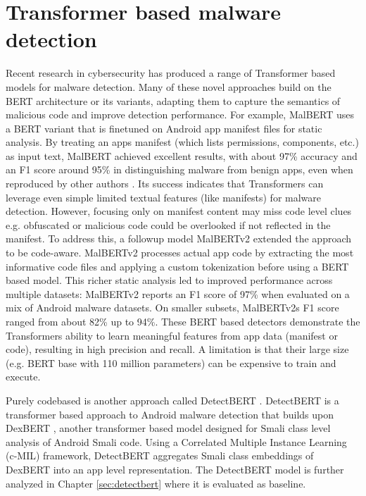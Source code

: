 \section{Transformer based malware detection}

Recent research in cybersecurity has produced a range of Transformer based models for malware detection.
Many of these novel approaches build on the BERT 
\cite{bert} 
architecture or its variants, 
adapting them to capture the semantics of malicious code and improve detection performance. 
For example, MalBERT 
\cite{malbert}
uses a BERT variant that is finetuned on Android app manifest files for static analysis. 
By treating an apps manifest (which lists permissions, components, etc.) as input text, 
MalBERT achieved excellent results, with about 97\% accuracy and an F1 score around 95\% 
in distinguishing malware from benign apps, even when reproduced by other authors 
\cite{malbert_reproduce}. 
Its success indicates that Transformers can leverage even simple limited textual features (like manifests) 
for malware detection. 
However, focusing only on manifest content may miss code level clues e.g. 
obfuscated or malicious code could be overlooked if not reflected in the manifest. 
To address this, a followup model MalBERTv2 
\cite{malbert_two} 
extended the approach to be code-aware. 
MalBERTv2 processes actual app code by extracting the most informative code files and applying a 
custom tokenization before using a BERT based model.
This richer static analysis led to improved performance across multiple datasets: 
MalBERTv2 reports an F1 score of 97\% when evaluated on a mix of Android malware datasets.
On smaller subsets, MalBERTv2s F1 score ranged from about 82\% up to 94\%. 
These BERT based detectors demonstrate the Transformers ability to learn meaningful features from 
app data (manifest or code), resulting in high precision and recall. 
A limitation is that their large size (e.g. BERT base with 110 million parameters) can be expensive to train and execute. 

Purely codebased is another approach called DetectBERT \cite{detectbert}.
DetectBERT is a transformer based approach to Android malware detection that 
builds upon DexBERT \cite{dexbert}, 
another transformer based model designed for Smali class level analysis of Android Smali code.
Using a Correlated Multiple Instance Learning (c-MIL) framework, 
DetectBERT aggregates Smali class embeddings of DexBERT into an app level representation.
The DetectBERT model is further analyzed in Chapter \ref{sec:detectbert} where it is evaluated as baseline.

